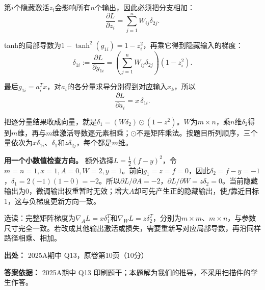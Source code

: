 第\(i\)个隐藏激活\(z_i\)会影响所有\(n\)个输出，因此必须把分支相加：
\[
\frac{\partial L}{\partial z_i}=\sum_{j=1}^{n}W_{ij}\delta_{2j}.
\]


tanh的局部导数为\(1-\tanh^2(g_{1i})=1-z_i^2\)，再乘它得到隐藏输入的梯度：
\[
\delta_{1i}:=\frac{\partial L}{\partial g_{1i}}
=\left(\sum_{j=1}^{n}W_{ij}\delta_{2j}\right)(1-z_i^2).
\]


最后\(g_{1i}=a_i^Tx\)，对\(a_i\)的各分量求导分别得到对应输入\(x_k\)，所以
\[
\frac{\partial L}{\partial a_i}=x\,\delta_{1i}.
\]


把逐分量结果收成向量，就是\(\delta_1=(W\delta_2)\odot(1-z^2)\)。\(W\)为\(m\times n\)，乘\(n\)维\(\delta_2\)得到\(m\)维，再与\(m\)维激活导数逐元素相乘；\(\odot\)不是矩阵乘法。按题目所列顺序，三个量依次为\(x\delta_{1i}\)、\(\delta_1\)和\(z\delta_{2j}\)，每个都是\(m\)维。


\textbf{用一个小数值检查方向。} 额外选择\(L=\frac12(f-y)^2\)，令\(m=n=1,x=1,A=0,W=2,y=1\)。前向\(g_1=z=f=0\)，因此\(\delta_2=f-y=-1\)，\(\delta_1=2(-1)(1-0)=-2\)。所以\(\partial L/\partial A=-2\)，\(\partial L/\partial W=z\delta_2=0\)。当前隐藏输出为0，微调输出权重暂时无效；增大\(A\)却可先产生正的隐藏输出，使\(f\)靠近目标1，这与负梯度更新方向一致。


选读：完整矩阵梯度为\(\nabla_A L=x\delta_1^T\)和\(\nabla_W L=z\delta_2^T\)，分别为\(m\times m\)、\(m\times n\)，与参数尺寸完全一致。若改成其他输出激活或损失，需要重新写对应局部导数，再沿同样路径相乘、相加。


\textbf{出处：} 2025A期中 Q13，原卷第10页（10分）


\textbf{答案依据：} 2025A期中 Q13 印刷题干；本题解为我们的推导，不采用扫描件的学生作答。
